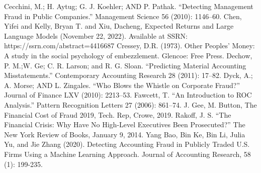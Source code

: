 \documentclass[conference]{IEEEtran}
\begin{document}
\begin{thebibliography}{00}
 Cecchini, M.; H. Aytug; G. J. Koehler; AND P. Pathak. “Detecting Management Fraud in Public Companies.” Management Science 56 (2010): 1146–60.
 Chen, Yifei and Kelly, Bryan T. and Xiu, Dacheng, Expected Returns and Large Language Models (November 22, 2022). Available at SSRN: https://ssrn.com/abstract=4416687
 Cressey, D.R. (1973). Other Peoples’ Money: A study in the social psychology of embezzlement. Glencoe: Free Press.
 Dechow, P. M.;W. Ge; C. R. Larson; and R. G. Sloan. “Predicting Material Accounting Misstatements.”
Contemporary Accounting Research 28 (2011): 17–82.
 Dyck, A.; A. Morse; AND L. Zingales. “Who Blows the Whistle on Corporate Fraud?” Journal of Finance LXV (2010): 2213–53.
 Fawcett, T. “An Introduction to ROC Analysis.” Pattern Recognition Letters 27 (2006): 861–74.
 J. Gee, M. Button, The Financial Cost of Fraud 2019, Tech. Rep, Crowe, 2019.
 Rakoff, J. S. “The Financial Crisis: Why Have No High-Level Executives Been Prosecuted?”
The New York Review of Books, January 9, 2014.
 Yang Bao, Bin Ke, Bin Li, Julia Yu, and Jie Zhang (2020). Detecting Accounting Fraud in Publicly Traded U.S. Firms Using a Machine Learning Approach. Journal of Accounting Research, 58 (1): 199-235.
\end{thebibliography}
\end{document}
